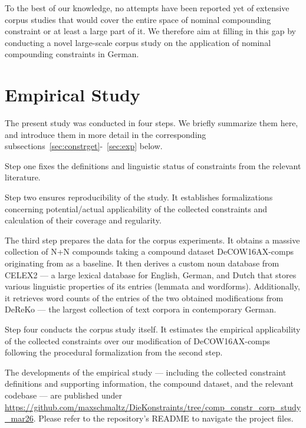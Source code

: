 \documentclass[10pt, a4paper]{article}
\begin{document}

To the best of our knowledge, no attempts have been reported yet of extensive corpus studies that would cover the entire space of nominal compounding constraint or at least a large part of it. We therefore aim at filling in this gap by conducting a novel large-scale corpus study on the application of nominal compounding constraints in German.




\section{Empirical Study}
\label{sec:corp}

The present study was conducted in four steps. We briefly summarize them here, and introduce them in more detail in the corresponding subsections~\ref{sec:constrget}-~\ref{sec:exp} below.

Step one fixes the definitions and linguistic status of constraints from the relevant literature.

Step two ensures reproducibility of the study. It establishes formalizations concerning potential/actual applicability of the collected constraints and calculation of their coverage and regularity.

The third step prepares the data for the corpus experiments. It obtains a massive collection of N+N compounds taking a compound dataset DeCOW16AX-comps originating from  as a baseline. It then derives a custom noun database from CELEX2  --- a large lexical database for English, German, and Dutch that stores various linguistic properties of its entries (lemmata and wordforms). Additionally, it retrieves word counts of the entries of the two obtained modifications from DeReKo  --- the largest collection of text corpora in contemporary German.

Step four conducts the corpus study itself. It estimates the empirical applicability of the collected constraints over our modification of DeCOW16AX-comps following the procedural formalization from the second step.

The developments of the empirical study --- including the collected constraint definitions and supporting information, the compound dataset, and the relevant codebase --- are published under \url{https://github.com/maxschmaltz/DieKonstraints/tree/comp_constr_corp_study_mar26}. Please refer to the repository's README to navigate the project files.
\end{document}
